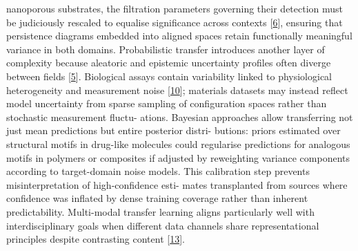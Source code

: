 \documentclass[
]{article}
\begin{document}
nanoporous substrates, the filtration parameters governing their
detection must be judiciously rescaled to equalise significance across
contexts {[}\hyperref[_bookmark46]{6}{]}, ensuring that persistence
diagrams embedded into aligned spaces retain functionally meaningful
variance in both domains. Probabilistic transfer introduces another
layer of complexity because aleatoric and epistemic uncertainty profiles
often diverge between fields {[}\hyperref[_bookmark45]{5}{]}. Biological
assays contain variability linked to physiological heterogeneity and
measurement noise {[}\hyperref[_bookmark50]{10}{]}; materials datasets
may instead reflect model uncertainty from sparse sampling of
configuration spaces rather than stochastic measurement fluctu- ations.
Bayesian approaches allow transferring not just mean predictions but
entire posterior distri- butions: priors estimated over structural
motifs in drug-like molecules could regularise predictions for analogous
motifs in polymers or composites if adjusted by reweighting variance
components according to target-domain noise models. This calibration
step prevents misinterpretation of high-confidence esti- mates
transplanted from sources where confidence was inflated by dense
training coverage rather than inherent predictability. Multi-modal
transfer learning aligns particularly well with interdisciplinary goals
when different data channels share representational principles despite
contrasting content {[}\hyperref[_bookmark53]{13}{]}.
\end{document}
